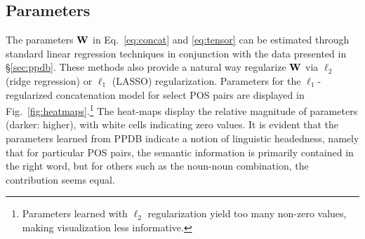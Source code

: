 \documentclass[11pt,letterpaper]{article}
\newcommand{\bW}{{\bf W}}
\begin{document}
\subsection{Parameters}
\label{sec:regularization}

The parameters $\bW$ in Eq.~\ref{eq:concat} and \ref{eq:tensor} can be estimated through standard linear regression techniques in conjunction with the data presented in \S\ref{sec:ppdb}.
These methods also provide a natural way regularize $\bW$ via $\ell_2$ (ridge regression) or $\ell_1$ (LASSO) regularization.  
Parameters for the $\ell_1$-regularized concatenation model for select POS pairs are displayed in Fig.~\ref{fig:heatmaps}.\footnote{Parameters learned with $\ell_2$ regularization yield too many non-zero values, making visualization less informative.}  
The heat-maps display the relative magnitude of parameters (darker: higher), with white cells indicating zero values. 
It is evident that the parameters learned from PPDB indicate a notion of linguistic headedness, namely that for particular POS pairs, the semantic information is primarily contained in the right word, but for others such as the noun-noun combination, the contribution seems equal. 
\end{document}
